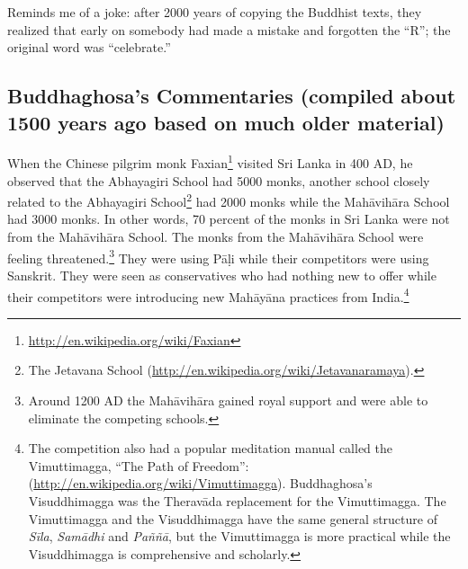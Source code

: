 Reminds me of a joke: after 2000 years of copying the Buddhist texts, they realized that early on somebody had made a mistake and forgotten the “R”; the original word was “celebrate.”

\subsection*{Buddhaghosa’s Commentaries (compiled about 1500 years ago based on much older material)}

When the Chinese pilgrim monk Faxian\footnote{\url{http://en.wikipedia.org/wiki/Faxian}} visited Sri Lanka in 400 AD, he observed that the Abhayagiri School had 5000 monks, another school closely related to the Abhayagiri School\footnote{The Jetavana School (\url{http://en.wikipedia.org/wiki/Jetavanaramaya}).} had 2000 monks while the Mahāvihāra School had 3000 monks. In other words, 70 percent of the monks in Sri Lanka were not from the Mahāvihāra School. The monks from the Mahāvihāra School were feeling threatened.\footnote{Around 1200 AD the Mahāvihāra gained royal support and were able to eliminate the competing schools.} They were using Pāḷi while their competitors were using Sanskrit. They were seen as conservatives who had nothing new to offer while their competitors were introducing new Mahāyāna practices from India.\footnote{The competition also had a popular meditation manual called the Vimuttimagga, “The Path of Freedom”: (\url{http://en.wikipedia.org/wiki/Vimuttimagga}). Buddhaghosa’s Visuddhimagga was the Theravāda replacement for the Vimuttimagga. The Vimuttimagga and the Visuddhimagga have the same general structure of \textit{Sīla}, \textit{Samādhi} and \textit{Paññā}, but the Vimuttimagga is more practical while the Visuddhimagga is comprehensive and scholarly.} 

